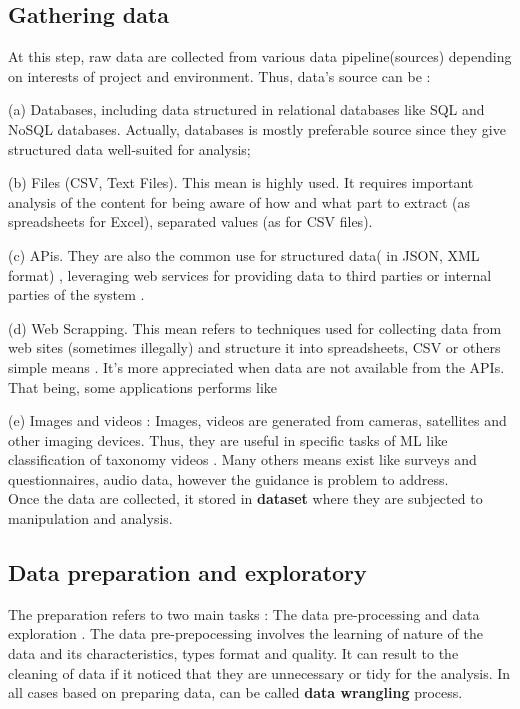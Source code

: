 \documentclass[12pt,a4paper, oneside]{book}
\begin{document}
\subsection{Gathering data}
At this step, raw data are collected from various data pipeline(sources) depending on interests of project and environment. Thus, data's source can be :  

(a) Databases, including data structured in relational databases like SQL and NoSQL databases. Actually, databases is mostly preferable source since they give structured data well-suited for analysis;

(b)  Files (CSV, Text Files). This mean is highly used. It requires important analysis of the content for being aware of how and what part to extract (as spreadsheets for Excel), separated values (as for CSV files).

(c) APis. They are also the common use for structured data( in JSON, XML format) , leveraging web services for providing data to third parties or internal parties of the system \citep{dataScienceMLeric}.

(d) Web Scrapping. This mean refers to techniques used for collecting data from web sites (sometimes illegally) and structure it into spreadsheets, CSV or others simple means \citep{sirisuriya2015comparative}. It's more appreciated when data are not available from the APIs. That being, some applications performs like 

(e) Images and videos : Images, videos are generated from cameras, satellites and other imaging devices. Thus, they are useful in specific tasks of ML like classification of taxonomy videos \citep{reviewVideo2020}. 
Many others means exist like surveys and questionnaires, audio data, however the guidance is problem to address. 
\\
Once the data are collected, it stored in \textbf{dataset} where they are subjected to manipulation and analysis.
\subsection{Data preparation and exploratory}
The preparation refers to two main tasks : The data pre-processing and data exploration . The data pre-prepocessing involves the learning of nature of the data and its characteristics, types format and quality. It can result to the cleaning of data if it noticed that they are unnecessary or tidy for the analysis. In all cases based on preparing data, can be called \textbf{data wrangling} \citep{furche2016data} process.
\end{document}
